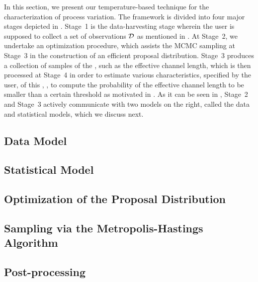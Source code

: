 
In this section, we present our temperature-based technique for the characterization of process variation. The framework is divided into four major stages depicted in .
Stage~1 is the data-harvesting stage wherein the user is supposed to collect a set of observations $\mathcal{D}$ as mentioned in .
At Stage~2, we undertake an optimization procedure, which assists the MCMC sampling at Stage~3 in the construction of an efficient proposal distribution.
Stage~3 produces a collection of samples of the \qoi, such as the effective channel length, which is then processed at Stage~4 in order to estimate various characteristics, specified by the user, of this \qoi, \eg, to compute the probability of the effective channel length to be smaller than a certain threshold as motivated in .
As it can be seen in , Stage~2 and Stage~3 actively communicate with two models on the right, called the data and statistical models, which we discuss next.

\subsection{Data Model}   


\subsection{Statistical Model} 


\subsection{Optimization of the Proposal Distribution} 


\subsection{Sampling via the Metropolis-Hastings Algorithm} 


\subsection{Post-processing} 

